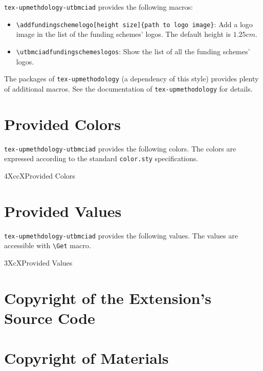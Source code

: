 \documentclass[article]{upmethodology-document}
\gdef\upmextensiondoccolorlist{}
\gdef\upmextensiondocvaluelist{}
\begin{document}
\texttt{tex-upmethdology-utbmciad} provides the following macros:
\begin{itemize}
\item \texttt{{\textbackslash}addfundingschemelogo[height size]\{path to logo image\}}: Add a logo image in the list of the funding schemes' logos. The default height is $1.25cm$.
\item \texttt{{\textbackslash}utbmciadfundingschemeslogos}: Show the list of all the funding schemes' logos.
\end{itemize}

The packages of \texttt{tex-upmethodology} (a dependency of this style) provides plenty of additional macros. See the documentation of \texttt{tex-upmethodology} for details.

\section{Provided Colors}

\texttt{tex-upmethdology-utbmciad} provides the following colors. The colors are expressed according to the standard \texttt{color.sty} specifications.

\begin{mtabular}{4}{XccX}{Provided Colors}
\upmextensiondoccolorlist
\end{mtabular}

\section{Provided Values}

\texttt{tex-upmethdology-utbmciad} provides the following values. The values are accessible with \texttt{{\textbackslash}Get} macro.

\begin{tiny}
\begin{mtabular}{3}{XcX}{Provided Values}
\upmextensiondocvaluelist
\end{mtabular}
\end{tiny}

\section{Copyright of the Extension's Source Code}



\section{Copyright of Materials}
\end{document}
